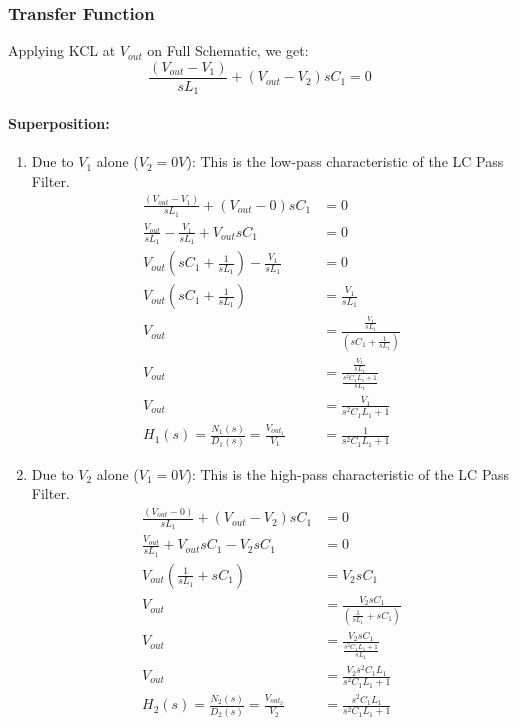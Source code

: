 \subsubsection{Transfer Function}
Applying KCL at $V_{out}$ on Full Schematic, we get:
\[
  \frac{(V_{out} - V_{1})}{sL_1} + (V_{out} - V_{2}){sC_1} = 0
\]
\paragraph{Superposition:}
\begin{enumerate}
  \item Due to \(V_{1}\) alone (\(V_{2} = 0V\)):
    This is the low-pass characteristic of the LC Pass Filter.
    \begin{align*}
      \frac{(V_{out} - V_{1})}{sL_1} + (V_{out} - 0)sC_1 &= 0 \\
      \frac{V_{out}}{sL_1} - \frac{V_{1}}{sL_1} + V_{out}sC_1 &= 0 \\
      V_{out}(sC_1 + \frac{1}{sL_1}) - \frac{V_{1}}{sL_1} &= 0 \\
      V_{out}(sC_1 + \frac{1}{sL_1}) &= \frac{V_{1}}{sL_1} \\
      V_{out} &= \frac{\frac{V_{1}}{sL_1}}{(sC_1 + \frac{1}{sL_1})} \\
      V_{out} &= \frac{\frac{V_{1}}{sL_1}}{\frac{s^2C_1L_1 + 1}{sL_1}} \\
      V_{out} &= \frac{V_{1}}{s^2C_1L_1 + 1} \\
      H_1(s) = \frac{N_1(s)}{D_1(s)} = \frac{V_{out_1}}{V_{1}} &= \frac{1}{s^2C_1L_1 + 1}
    \end{align*}
  \item Due to \(V_{2}\) alone (\(V_{1} = 0V\)):
    This is the high-pass characteristic of the LC Pass Filter.
    \begin{align*}
      \frac{(V_{out} - 0)}{sL_1} + (V_{out} - V_{2})sC_1 &= 0 \\
      \frac{V_{out}}{sL_1} + V_{out}sC_1 - V_{2}sC_1 &= 0 \\
      V_{out}(\frac{1}{sL_1} + sC_1) &= V_{2}sC_1 \\
      V_{out} &= \frac{V_{2}sC_1}{(\frac{1}{sL_1} + sC_1)} \\
      V_{out} &= \frac{V_{2}sC_1}{\frac{s^2C_1L_1 + 1}{sL_1}} \\
      V_{out} &= \frac{V_{2}s^2C_1L_1}{s^2C_1L_1 + 1} \\
      H_2(s) = \frac{N_2(s)}{D_2(s)} = \frac{V_{out_2}}{V_{2}} &= \frac{s^2C_1L_1}{s^2C_1L_1 + 1}
    \end{align*}
\end{enumerate}
